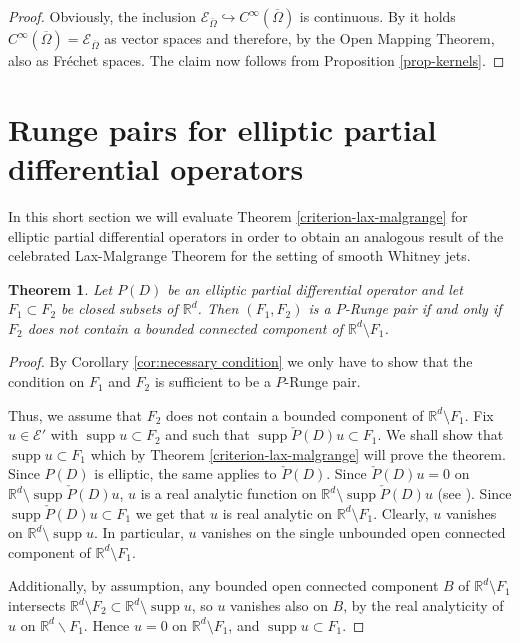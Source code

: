 \documentclass[10pt,leqno]{amsart}
\newtheorem{theorem}[prop]{Theorem}
\theoremstyle{definition}
\newcommand{\R}{\mathbb R}
\newcommand{\supp}{\operatorname{supp}}
\begin{document}
\begin{proof}
	Obviously, the inclusion $\mathscr{E}_{\overline{\Omega}}\hookrightarrow C^\infty(\overline{\Omega})$ is continuous. By \cite[Proposition 2.16]{Bierstone1980} it holds $C^\infty(\overline{\Omega})=\mathscr{E}_{\overline{\Omega}}$ as vector spaces and therefore, by the Open Mapping Theorem, also as Fr\'echet spaces. The claim now follows from Proposition \ref{prop-kernels}. 
\end{proof}


\section{Runge pairs for elliptic partial differential operators}\label{section:elliptic}

In this short section we will evaluate Theorem \ref{criterion-lax-malgrange} for elliptic partial differential operators in order to obtain an analogous result of the celebrated Lax-Malgrange Theorem for the setting of smooth Whitney jets. 

\begin{theorem}\label{theorem:elliptic}
	Let $P(D)$ be an elliptic partial differential operator and let $F_1\subset F_2$ be closed subsets of $\R^d$. Then $(F_1, F_2)$ is a $P$-Runge pair if and only if $F_2$ does not contain a bounded connected component of $\R^d\setminus F_1$.
\end{theorem}

\begin{proof}
	By Corollary \ref{cor:necessary condition} we only have to show that the condition on $F_1$ and $F_2$ is sufficient to be a $P$-Runge pair.
	
	Thus, we assume that $F_2$ does not contain a bounded component of $\R^d\setminus F_1$. Fix $u\in\mathscr{E}'$ with $\supp u\subset F_2$ and such that $\supp \check P(D)u\subset F_1$. We shall show that $\supp u\subset F_1$ which by Theorem \ref{criterion-lax-malgrange} will prove the theorem. Since $P(D)$ is elliptic, the same applies to $\check{P}(D)$. Since $\check P(D)u=0$ on $\R^d\setminus \supp \check P(D)u$, $u$ is a real analytic function on $\R^d\setminus \supp \check P(D)u$ (see \cite[Corollary 11.4.13]{Hor2}). Since $\supp\check{P}(D)u\subset F_1$ we get that $u$ is real analytic on $\R^d\setminus F_1$. Clearly, $u$ vanishes on $\R^d\setminus \supp u$. In particular, $u$ vanishes on the single unbounded open connected component of $\R^d\setminus F_1$.
	
	Additionally, by assumption, any bounded open connected component $B$ of $\R^d\setminus F_1$ intersects $\R^d\setminus F_2\subset \R^d\setminus\supp  u$, so $u$ vanishes also on $B$, by the real analyticity of $u$ on $\R^d\backslash F_1$. Hence $u=0$ on $\R^d\setminus F_1$, and $\supp u\subset F_1$.          
\end{proof}
\end{document}
